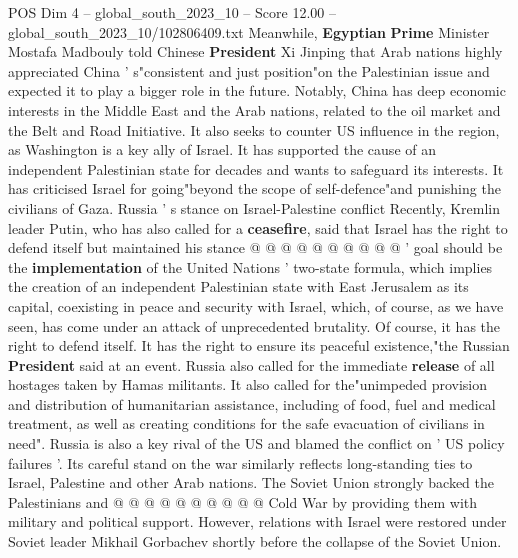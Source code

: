 \begin{textsample}{POS Dim 4 – global\_south\_2023\_10 – Score 12.00 – global\_south\_2023\_10/102806409.txt}
Meanwhile, \textbf{Egyptian} \textbf{Prime} Minister Mostafa Madbouly told Chinese \textbf{President} Xi Jinping that Arab nations highly appreciated China ' s"consistent and just position"on the Palestinian issue and expected it to play a bigger role in the future.
Notably, China has deep economic interests in the Middle East and the Arab nations, related to the oil market and the Belt and Road Initiative.
It also seeks to counter US influence in the region, as Washington is a key ally of Israel.
It has supported the cause of an independent Palestinian state for decades and wants to safeguard its interests.
It has criticised Israel for going"beyond the scope of self-defence"and punishing the civilians of Gaza.
Russia ' s stance on Israel-Palestine conflict Recently, Kremlin leader Putin, who has also called for a \textbf{ceasefire}, said that Israel has the right to defend itself but maintained his stance @ @ @ @ @ @ @ @ @ @ ' goal should be the \textbf{implementation} of the United Nations ' two-state formula, which implies the creation of an independent Palestinian state with East Jerusalem as its capital, coexisting in peace and security with Israel, which, of course, as we have seen, has come under an attack of unprecedented brutality.
Of course, it has the right to defend itself.
It has the right to ensure its peaceful existence,"the Russian \textbf{President} said at an event.
Russia also called for the immediate \textbf{release} of all hostages taken by Hamas militants.
It also called for the"unimpeded provision and distribution of humanitarian assistance, including of food, fuel and medical treatment, as well as creating conditions for the safe evacuation of civilians in need".
Russia is also a key rival of the US and blamed the conflict on ' US policy failures '.
Its careful stand on the war similarly reflects long-standing ties to Israel, Palestine and other Arab nations.
The Soviet Union strongly backed the Palestinians and @ @ @ @ @ @ @ @ @ @ Cold War by providing them with military and political support.
However, relations with Israel were restored under Soviet leader Mikhail Gorbachev shortly before the collapse of the Soviet Union.

\end{textsample}
